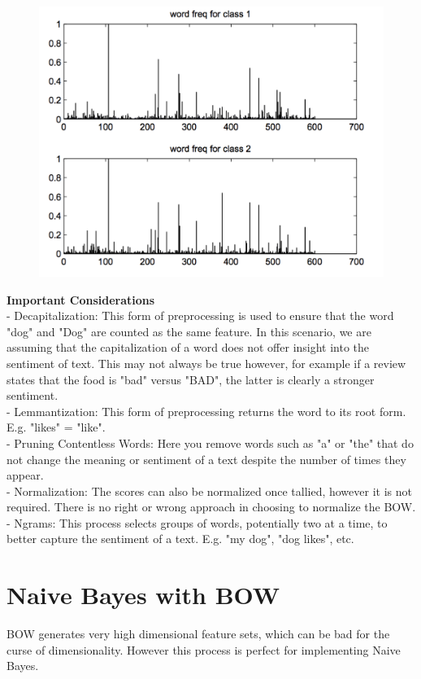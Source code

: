 \documentclass[11pt]{report}
\begin{document}
\begin{figure}[ht]
    \centering
    \includegraphics[width=0.8\linewidth]{image_4.png}
    \captionsetup{labelformat=empty}
\end{figure} 

\textbf{Important Considerations} \\

- Decapitalization: This form of preprocessing is used to ensure that the word "dog" and "Dog" are counted as the same feature. In this scenario, we are assuming that the capitalization of a word does not offer insight into the sentiment of text. This may not always be true however, for example if a review states that the food is "bad" versus "BAD", the latter is clearly a stronger sentiment. \\

- Lemmantization: This form of preprocessing returns the word to its root form. E.g. "likes" = "like". \\

- Pruning Contentless Words: Here you remove words such as "a" or "the" that do not change the meaning or sentiment of a text despite the number of times they appear. \\

- Normalization: The scores can also be normalized once tallied, however it is not required. There is no right or wrong approach in choosing to normalize the BOW. \\

- Ngrams: This process selects groups of words, potentially two at a time, to better capture the sentiment of a text. E.g. "my dog", "dog likes", etc. \\


\section{Naive Bayes with BOW}
BOW generates very high dimensional feature sets, which can be bad for the curse of dimensionality. However this process is perfect for implementing Naive Bayes. \\
\end{document}
